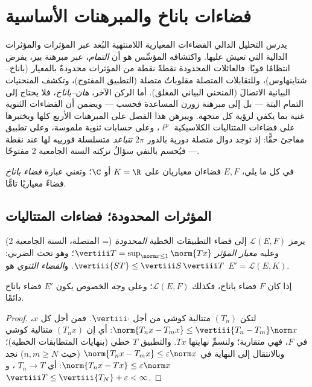 \chapter{فضاءات باناخ والمبرهنات الأساسية}
\label{ch:b3:banach}

يدرس التحليل الدالي الفضاءات المعيارية اللامنتهية البُعد عبر
المؤثرات والمؤثرات الدالية التي تعيش عليها. واكتشافه المؤسِّس هو
أن \emph{التمام}، عبر مبرهنة بير، يفرض انتظامًا قويًا: فالعائلات
المحدودة نقطةً نقطة من المؤثرات محدودةٌ بالمعيار
(باناخ--شتاينهاوس)، وللتقابلات المتصلة مقلوباتٌ متصلة (التطبيق
المفتوح)، وتكشف المنحنيات البيانية الاتصالَ (المنحني البياني
المغلق). أما الركن الآخر، \emph{هان--باناخ}، فلا يحتاج إلى
التمام البتة --- بل إلى مبرهنة زورن المساعدة فحسب --- ويضمن أن
الفضاءات الثنوية غنية بما يكفي لرؤية كل متجهة. ويبرهن هذا الفصل
على المبرهنات الأربع كلها ويختبرها على فضاءات المتتاليات
الكلاسيكية $\ell^p$، وعلى حسابات ثنوية ملموسة، وعلى تطبيق مفاجئ
حقًّا: إذ توجد دوال متصلة دورية بالدور $2\pi$ \emph{تتباعد}
متسلسلة فورييه لها عند نقطة --- فيُحسم بالنفي سؤالٌ تركته السنة
الجامعية 2 مفتوحًا.

في كل ما يلي، $E, F$ فضاءان معياريان على $K = \R$ أو $\C$؛
وتعني عبارة \emph{فضاء باناخ} فضاءً معياريًا
تامًّا.

\section{المؤثرات المحدودة؛ فضاءات المتتاليات}

\begin{definition}\label{def:b3:banach:operator}
يرمز $\mathcal L(E, F)$ إلى فضاء التطبيقات الخطية \emph{المحدودة} (= المتصلة،
السنة الجامعية 2) وعليه \emph{معيار المؤثر}
$\vertiii T = \sup_{\norm x \leq
1}\norm{Tx}$؛ وهو تحت الضربي: $\vertiii{ST} \leq
\vertiii S\,\vertiii T$. و\emph{الفضاء
الثنوي} هو $E' = \mathcal L(E, K)$.
\end{definition}

\begin{proposition}\label{prop:b3:banach:llcomplete}
إذا كان $F$ فضاء باناخ، فكذلك $\mathcal L(E, F)$؛ وعلى وجه الخصوص يكون $E'$
فضاء باناخ دائمًا.
\end{proposition}

\begin{proof}
لتكن $(T_n)$ متتالية كوشي من أجل $\vertiii\cdot$. فمن أجل كل
$x$، $\norm{T_nx - T_mx} \leq \vertiii{T_n - T_m}\norm x$: أي إن $(T_nx)$ متتالية كوشي في $F$، فهي متقاربة؛
ولنسمِّ نهايتها $Tx$. والتطبيق $T$ خطي (بنهايات المتطابقات
الخطية)؛ وبالانتقال إلى النهاية في $\norm{T_nx - T_mx} \leq \varepsilon\norm x$ (حيث $n, m \geq N$)
نجد $\norm{T_nx - Tx} \leq \varepsilon\norm x$: أي $T_n \to T$ ، و $\vertiii T \leq \vertiii{T_N} +
\varepsilon < \infty$.
\end{proof}

